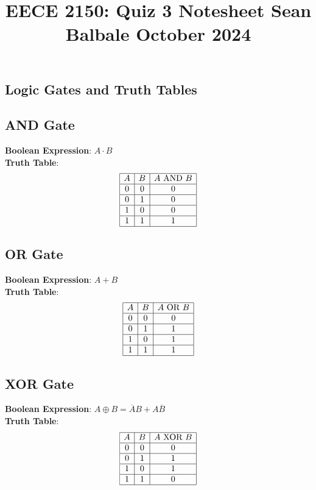 \documentclass[10pt]{article}
\title{
    \raggedright
    \large EECE 2150: Quiz 3 Notesheet \hfill Sean Balbale \hfill October 2024
    \vspace{-4em}
}
\date{}
\begin{document}
\maketitle

\begin{multicols}{2}
    
\section{Logic Gates and Truth Tables}

\subsection{AND Gate}
\textbf{Boolean Expression}: \( A \cdot B \) \\
\textbf{Truth Table}:
\[
\begin{array}{|c|c|c|}
\hline
A & B & A \text{ AND } B \\
\hline
0 & 0 & 0 \\\hline
0 & 1 & 0 \\\hline
1 & 0 & 0 \\\hline
1 & 1 & 1 \\\hline
\end{array}
\]

\subsection{OR Gate}
\textbf{Boolean Expression}: \( A + B \) \\
\textbf{Truth Table}:
\[
\begin{array}{|c|c|c|}
\hline
A & B & A \text{ OR } B \\
\hline
0 & 0 & 0 \\\hline
0 & 1 & 1 \\\hline
1 & 0 & 1 \\\hline
1 & 1 & 1 \\\hline
\end{array}
\]

\subsection{XOR Gate}
\textbf{Boolean Expression}: \( A \oplus B = \overline{A}B + A\overline{B}\) \\
\textbf{Truth Table}:
\[
\begin{array}{|c|c|c|}
\hline
A & B & A \text{ XOR } B \\
\hline
0 & 0 & 0 \\\hline
0 & 1 & 1 \\\hline
1 & 0 & 1 \\\hline
1 & 1 & 0 \\\hline
\end{array}
\]


\end{multicols}
\end{document}
